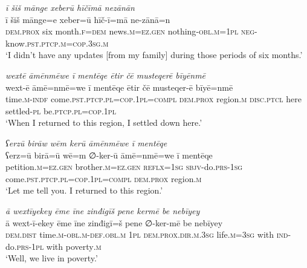 \ea \label{ŽM.36}
\textit{ī šiš mānge xeberū hīčīmā nezānān} \\ 
\gll ī šiš mānge=e xeber=ū hīč-ī=mā ne-zānā=n \\ 
 \textsc{dem.prox} six month\textsc{.f}\textsc{=dem} news\textsc{.m}\textsc{=ez.gen} nothing\textsc{-obl}\textsc{.m}\textsc{=\textsc{1pl}} \textsc{neg-}know\textsc{.pst}\textsc{.ptcp}\textsc{.m}\textsc{=cop}\textsc{.3sg}\textsc{.m} \\ 
\glt `I didn’t have any updates [from my family] during those periods of six months.'
\z 
 
\ea \label{ŽM.51}
\textit{wextē āmēnmēwe ī mentēqe ētir čē musteqerē bīyēnmē} \\ 
\gll wext-ē āmē=nmē=we ī mentēqe ētir čē musteqer-ē bīyē=nmē \\ 
 time\textsc{.m}\textsc{-indf} come\textsc{.pst}\textsc{.ptcp}\textsc{.pl}\textsc{=cop}\textsc{.\textsc{1pl}}\textsc{=compl} \textsc{dem.prox} region\textsc{.m} \textsc{disc}.\textsc{ptcl} here settled\textsc{\textsc{-pl}} be\textsc{.ptcp}\textsc{.pl}\textsc{=cop}\textsc{.\textsc{1pl}} \\ 
\glt `When I returned to this region, I settled down here.'
\z 
 
\ea \label{ŽM.53}
\textit{ʕerzū birāw wēm kerū āmēnmēwe ī mentēqe} \\ 
\gll ʕerz=ū birā=ū wē=m ∅-ker-ū āmē=nmē=we ī mentēqe \\ 
 petition\textsc{.m}\textsc{=ez.gen} brother\textsc{.m}\textsc{=ez.gen} \textsc{reflx}\textsc{=\textsc{1sg}} \textsc{sbjv-}do\textsc{.prs}\textsc{-\textsc{1sg}} come\textsc{.pst}\textsc{.ptcp}\textsc{.pl}\textsc{=cop}\textsc{.\textsc{1pl}}\textsc{=compl} \textsc{dem.prox} region\textsc{.m} \\ 
\glt `Let me tell you. I returned to this region.'
\z 
 
\ea \label{ŽM.57}
\textit{ā wextīyekey ēme īne zinđigīš pene kermē be nebīyey} \\ 
\gll ā wext-ī-ekey ēme īne zinđigī=š pene ∅-ker-mē be nebīyey \\ 
 \textsc{dem.dist} time\textsc{.m}\textsc{-obl}\textsc{.m}\textsc{-def}\textsc{.obl}\textsc{.m} \textsc{1pl} \textsc{dem.prox}\textsc{.dir}\textsc{.m}\textsc{.3sg} life\textsc{.m}\textsc{=3sg} with \textsc{ind-}do\textsc{.prs}\textsc{-\textsc{1pl}} with poverty\textsc{.m} \\ 
\glt `Well, we live in poverty.'
\z 
 
